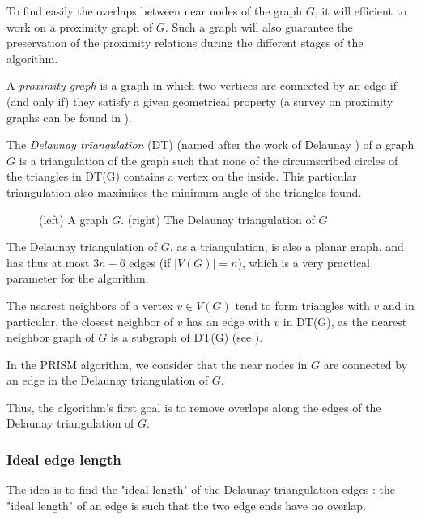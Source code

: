 \documentclass[12pt]{report}
\begin{document}
To find easily the overlaps between near nodes of the graph $G$, it will efficient to work on a proximity graph of $G$. Such a graph will also guarantee the preservation of the proximity relations during the different stages of the algorithm.

A \emph{proximity graph} is a graph in which two vertices are connected by an edge if (and only if) they satisfy a given geometrical property (a survey on proximity graphs can be found in \cite{JT92}).

\bigskip
The \emph{Delaunay triangulation} (DT) (named after the work of Delaunay \cite{Delaunay34}) of a graph $G$ is a triangulation of the graph such that none of the circumscribed circles of the triangles in DT(G) contains a vertex on the inside. This particular triangulation also maximises the minimum angle of the triangles found.

\begin{figure}[h]
	\center
  \setlength\fboxsep{5pt}
  \setlength\fboxrule{0.5pt}
  \caption{(left) A graph $G$. (right) The Delaunay triangulation of $G$}
  \label{DT}
\end{figure}

The Delaunay triangulation of $G$, as a triangulation, is also a planar graph, and has thus at most $3n -6$ edges (if $|V(G)| = n$), which is a very practical parameter for the algorithm.

\bigskip
The nearest neighbors of a vertex $v \in V(G)$ tend to form triangles with $v$ and in particular, the closest neighbor of $v$ has an edge with $v$ in DT(G), as the nearest neighbor graph of $G$ is a subgraph of DT(G) (see \cite{JT92}).

In the PRISM algorithm, we consider that the near nodes in $G$ are connected by an edge in the Delaunay triangulation of $G$.

Thus, the algorithm's first goal is to remove overlaps along the edges of the Delaunay triangulation of $G$.

\subsubsection{Ideal edge length}
The idea is to find the "ideal length" of the Delaunay triangulation edges : the "ideal length" of an edge is such that the two edge ends have no overlap.
\end{document}
